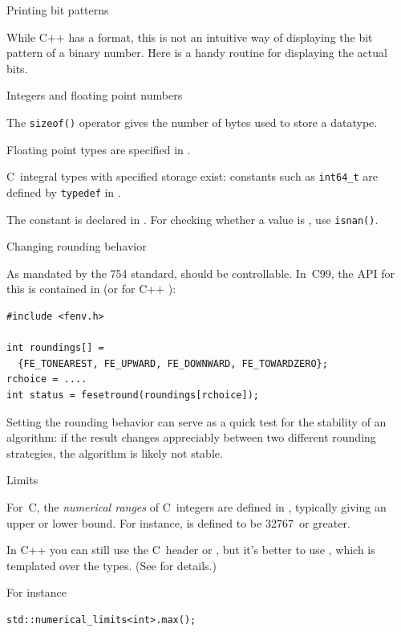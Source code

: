  {Printing bit patterns}

While C++ has a  format,
this is not an intuitive way of displaying the bit pattern of a
binary number.
Here is a handy routine for displaying the actual bits.


 {Integers and floating point numbers}
\label{sec:sizeof}

The \texttt{sizeof()} operator gives the
number of bytes used to store a datatype.

Floating point types are specified in .

C~integral types with specified storage exist: constants such as
\lstinline{int64_t} are defined by \lstinline{typedef} in .

The constant  is declared in .
For checking whether a value is , use \lstinline{isnan()}.

 {Changing rounding behavior}
\label{sec:fenvh-round}

As mandated by the 754 standard,
 should be controllable.
In~C99, the API for this is contained in  (or for
C++ ):
\begin{lstlisting}
#include <fenv.h>

int roundings[] =
  {FE_TONEAREST, FE_UPWARD, FE_DOWNWARD, FE_TOWARDZERO};
rchoice = ....
int status = fesetround(roundings[rchoice]);            
\end{lstlisting}

Setting the rounding behavior can serve as a quick test for the stability
of an algorithm: if the result changes appreciably between two different
rounding strategies, the algorithm is likely not stable.

 {Limits}

For~C,
the \emph{numerical ranges}
of C~integers are defined in ,
typically giving an upper or lower bound.
For instance,  is defined to be 32767~or greater.

In C++
you can still use the C~header  or
, but it's better to use
, which is templated over the types.
(See  for details.)

For instance
\lstset{language=C++}
\begin{lstlisting}
std::numerical_limits<int>.max();
\end{lstlisting}

